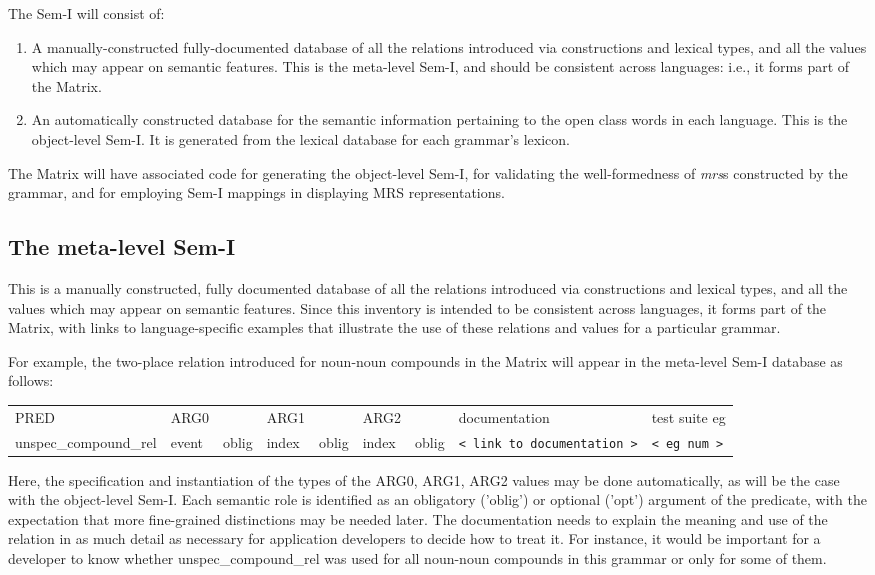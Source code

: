 \documentclass[12pt]{article}
\begin{document}
The Sem-I will consist of:
\begin{enumerate}
\item A manually-constructed
fully-documented database of all the relations introduced 
via constructions
and lexical types, and all the values which may appear on semantic 
features.  This is the meta-level Sem-I, and should be consistent across
languages: i.e., it forms part of the Matrix.
\item An automatically constructed database for the semantic information
pertaining to the open class words in each language.
This is the object-level Sem-I.  It is generated from the lexical
database for each grammar's lexicon.
\end{enumerate}

The Matrix will have associated code for generating the object-level
Sem-I, for validating the well-formedness of {\it mrs}s constructed by the 
grammar, and for employing Sem-I mappings in displaying MRS representations.

\subsection{The meta-level Sem-I}

This is a manually constructed,  fully documented database of all the 
relations introduced via constructions and lexical types, and all the values 
which may appear on semantic features.  Since this inventory is intended
to be consistent across languages, it forms part of the Matrix,
with links to language-specific examples that illustrate the use of these
relations and values for a particular grammar.

For example, the two-place relation introduced for noun-noun compounds in
the Matrix will appear in the meta-level Sem-I database as follows:\\
\begin{tabular}{lllllllll}
PRED & ARG0 & & ARG1 & & ARG2 & & documentation & test suite eg\\
unspec\_compound\_rel & event & oblig & 
index & oblig & index & oblig & \verb+< link to documentation >+ & 
\verb+< eg num >+
\end{tabular}

Here, the specification and instantiation of the types
of the ARG0, ARG1, ARG2 values may be done automatically, as will be the case
with the object-level Sem-I.  Each semantic role is identified as an
obligatory ('oblig') or optional ('opt') argument of the predicate, with the 
expectation that more fine-grained distinctions may be needed later.
The documentation needs to explain the meaning and use
of the relation in as much detail as necessary for application
developers to decide how to treat it.  For instance, it would be 
important for a developer
to know whether unspec\_compound\_rel was used for all 
noun-noun compounds in this grammar or only for some of them.
\end{document}

